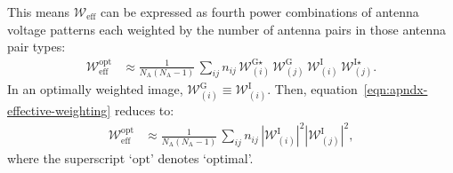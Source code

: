 \documentclass[a4paper,fleqn,usenatbib]{mnras}
\newcommand{\Nant}{N_\textrm{A}}
\begin{document}
This means $\mathcal{W}_\textrm{eff}$ can be expressed as fourth power combinations of antenna voltage patterns each weighted by the number of antenna pairs in those antenna pair types:
\begin{align}
  \mathcal{W}_\textrm{eff}^\textrm{opt} &\approx \frac{1}{\Nant(\Nant-1)}\,\sum_{ij}n_{ij}\,\mathcal{W}^{\textrm{G}\star}_{(i)}\,\mathcal{W}^\textrm{G}_{(j)}\,\mathcal{W}^\textrm{I}_{(i)}\,\mathcal{W}^{\textrm{I}\star}_{(j)}.
\end{align}
In an optimally weighted image, $\mathcal{W}^\textrm{G}_{(i)} \equiv \mathcal{W}^\textrm{I}_{(i)}$. Then, equation~\ref{eqn:apndx-effective-weighting} reduces to:
\begin{align}\label{eqn:apndx-effective-weighting-optimal}
  \mathcal{W}_\textrm{eff}^\textrm{opt} &\approx \frac{1}{\Nant(\Nant-1)}\,\sum_{ij} n_{ij}\,\left|\mathcal{W}^\textrm{I}_{(i)}\right|^2\left|\mathcal{W}^\textrm{I}_{(j)}\right|^2,
\end{align}
where the superscript `$\textrm{opt}$' denotes `optimal'.





\bsp	%
\label{lastpage}
\end{document}
